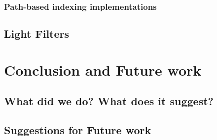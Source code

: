 \documentclass{l4proj}
\begin{document}
        \subsection{Path-based indexing implementations}
    \section{Light Filters}
    
\chapter{Conclusion and Future work}
	\section{What did we do? What does it suggest?}
    \section{Suggestions for Future work}
\end{document}
